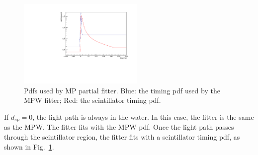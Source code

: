 \documentclass[preprint,12pt]{elsarticle}
\numberwithin{equation}{section}
\begin{document}
\begin{figure}[htbp]
	\centering	
	\includegraphics[width=6cm]{scintpdf.pdf}
	\caption{ Pdfs used by MP partial fitter. Blue: the timing pdf used by the MPW fitter; Red: the scintillator timing pdf.}
	\label{partialpdf}
\end{figure}

If $d_{sp}=0$, the light path is always in the water. In this case, the fitter is the same as the MPW. The fitter fits with the MPW pdf. Once the light path passes through the scintillator region, the fitter fits with a scintillator timing pdf, as shown in Fig.~\ref{partialpdf}.
\end{document}
